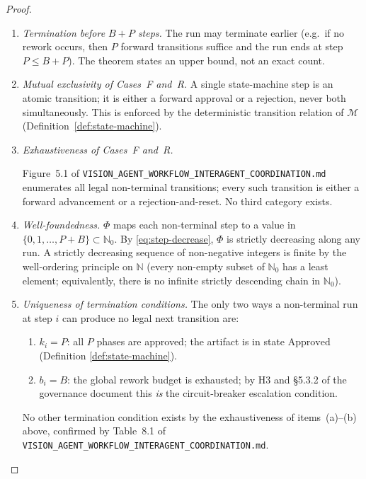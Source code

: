 \documentclass[12pt]{article}
\theoremstyle{definition}
\newcommand{\code}[1]{\texttt{#1}}
\newcommand{\VisionFlow}{\code{VISION\_AGENT\_\allowbreak WORKFLOW\_\allowbreak INTERAGENT\_\allowbreak COORDINATION.md}}
\begin{document}
\begin{proof}
\begin{enumerate}
  \item \emph{Termination before $B + P$ steps.}
        The run may terminate earlier (e.g.\ if no rework occurs,
        then $P$ forward transitions suffice and the run ends at
        step~$P \leq B+P$).  The theorem states an upper bound, not
        an exact count.

  \item \emph{Mutual exclusivity of Cases~F and~R.}
        A single state-machine step is an atomic transition; it is
        either a forward approval or a rejection, never both
        simultaneously.  This is enforced by the deterministic
        transition relation of $\mathcal{M}$
        (Definition~\ref{def:state-machine}).

  \item \emph{Exhaustiveness of Cases~F and~R.}
        \begin{sloppypar}
        Figure~5.1 of
        \VisionFlow{}
        enumerates all legal non-terminal transitions; every such
        transition is either a forward advancement or a
        rejection-and-reset.  No third category exists.
        \end{sloppypar}

  \item \emph{Well-foundedness.}
        $\Phi$ maps each non-terminal step to a value in
        $\{0, 1, \ldots, P+B\} \subset \mathbb{N}_0$.  By
        \eqref{eq:step-decrease}, $\Phi$ is strictly decreasing along
        any run.  A strictly decreasing sequence of non-negative
        integers is finite by the well-ordering principle on
        $\mathbb{N}$ (every non-empty subset of $\mathbb{N}_0$ has a
        least element; equivalently, there is no infinite strictly
        descending chain in $\mathbb{N}_0$).

  \item \emph{Uniqueness of termination conditions.}
        The only two ways a non-terminal run at step $i$ can produce
        no legal next transition are:
        \begin{enumerate}
          \item $k_i = P$: all $P$ phases are approved; the artifact
                is in state $\mathrm{Approved}$ (Definition
                \ref{def:state-machine}).
          \item $b_i = B$: the global rework budget is exhausted;
                by H3 and \S5.3.2 of the governance document this
                \emph{is} the circuit-breaker escalation condition.
        \end{enumerate}
        No other termination condition exists by the exhaustiveness
        of items~(a)--(b) above, confirmed by Table~8.1 of
        \VisionFlow{}.
\end{enumerate}


\end{proof}
\end{document}

